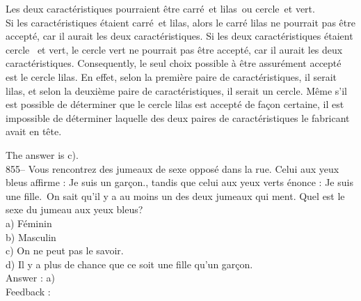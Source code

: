 \documentclass[letterpaper, 12pt]{article}
\begin{document}
Les deux caract\'eristiques pourraient \^etre \og carr\'e\fg\ et
\og lilas\fg\ ou \og cercle\fg\ et \og vert\fg.\\
Si les caract\'eristiques \'etaient \og carr\'e\fg\ et \og lilas\fg,
alors le carr\'e lilas ne pourrait pas \^etre accept\'e, car il
aurait les deux caract\'eristiques. Si les deux caract\'eristiques
\'etaient \og cercle \fg\ et \og vert\fg , le cercle vert ne
pourrait pas \^etre accept\'e, car il aurait les deux
caract\'eristiques. Consequently, le seul choix possible \`a
\^etre assur\'ement accept\'e est le cercle lilas.  En effet, selon
la premi\`ere paire de caract\'eristiques, il serait lilas, et selon
la deuxi\`eme paire de caract\'eristiques, il serait un cercle.
M\^eme s'il est possible de d\'eterminer que le cercle lilas est
accept\'e de fa\c con certaine, il est impossible de d\'eterminer
laquelle des deux paires de caract\'eristiques le fabricant avait en
t\^ete.

The answer is c).\\

855-- Vous rencontrez des jumeaux de sexe oppos\'e dans la rue.
Celui aux yeux bleus affirme : \og Je suis un gar\c con.\fg , tandis
que celui aux yeux verts \'enonce : \og Je suis une fille.\fg\  On
sait qu'il y a au moins un des deux jumeaux qui ment.  Quel est le
sexe du jumeau aux yeux bleus?\\
a) F\'eminin\\
b) Masculin\\
c) On ne peut pas le savoir.\\
d) Il y a plus de chance que ce soit une fille qu'un gar\c con.\\

Answer : a)\\

Feedback : \\
\end{document}
